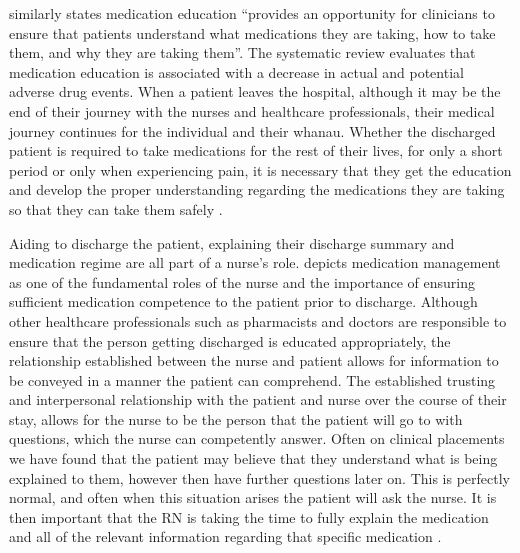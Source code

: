 \documentclass[british,12pt,a4paper]{article}
\begin{document}
	\citeauthor{Alper2023} similarly states medication education “provides an opportunity for clinicians to ensure that patients understand what medications they are taking, how to take them, and why they are taking them”. The systematic review evaluates that medication education is associated with a decrease in actual and potential adverse drug events. When a patient leaves the hospital, although it may be the end of their journey with the nurses and healthcare professionals, their medical journey continues for the individual and their whanau. Whether the discharged patient is required to take medications for the rest of their lives, for only a short period or only when experiencing pain, it is necessary that they get the education and develop the proper understanding regarding the medications they are taking so that they can take them safely \parencite{Yap2016}. 

	Aiding to discharge the patient, explaining their discharge summary and medication regime are all part of a nurse's role. \textcite{Sulosaari2014} depicts medication management as one of the fundamental roles of the nurse and the importance of ensuring sufficient medication competence to the patient prior to discharge. Although other healthcare professionals such as pharmacists and doctors are responsible to ensure that the person getting discharged is educated appropriately, the relationship established between the nurse and patient allows for information to be conveyed in a manner the patient can comprehend. The established trusting and interpersonal relationship with the patient and nurse over the course of their stay, allows for the nurse to be the person that the patient will go to with questions, which the nurse can competently answer. Often on clinical placements we have found that the patient may believe that they understand what is being explained to them, however then have further questions later on. This is perfectly normal, and often when this situation arises the patient will ask the nurse. It is then important that the RN is taking the time to fully explain the medication and all of the relevant information regarding that specific medication \parencite{Flatman2021}.
\end{document}
